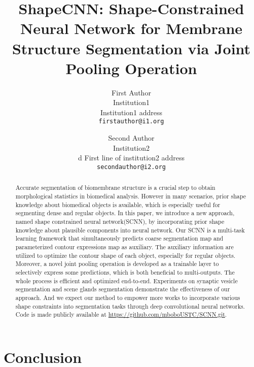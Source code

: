 \documentclass[10pt,twocolumn,letterpaper]{article}
\begin{document}
\title{ShapeCNN: Shape-Constrained Neural Network for Membrane Structure Segmentation via Joint Pooling Operation}

\author{First Author\\
Institution1\\
Institution1 address\\
{\tt\small firstauthor@i1.org}
\and
Second Author\\
Institution2\\d
First line of institution2 address\\
{\tt\small secondauthor@i2.org}
}

\maketitle


\begin{abstract}
   Accurate segmentation of biomembrane structure is a crucial step to obtain morphological statistics in biomedical analysis.
   However in many scenarios, prior shape knowledge about biomedical objects is available, which is especially useful for segmenting dense and regular objects.
   In this paper, we introduce a new approach, named shape constrained neural network(SCNN), by incorporating prior shape knowledge about plausible components into neural network.
   Our SCNN is a multi-task learning framework that simultaneously predicts coarse segmentation map and parameterized contour expressions map as auxiliary.
   The auxiliary information are utilized to optimize the contour shape of each object, especially for regular objects.
   Moreover, a novel joint pooling operation is developed as a trainable layer to selectively express some predictions, which is both beneficial to multi-outputs.
   The whole process is efficient and optimized end-to-end.
   Experiments on synaptic vesicle segmentation and scene glands segmentation demonstrate the effectiveness of our approach.
   And we expect our method to empower more works to incorporate various shape constraints into segmentation tasks through deep convolutional neural networks.
   Code is made publicly available at \url{https://github.com/mboboUSTC/SCNN.git}.

\end{abstract}





\section{Conclusion}


{\small


}
\end{document}
